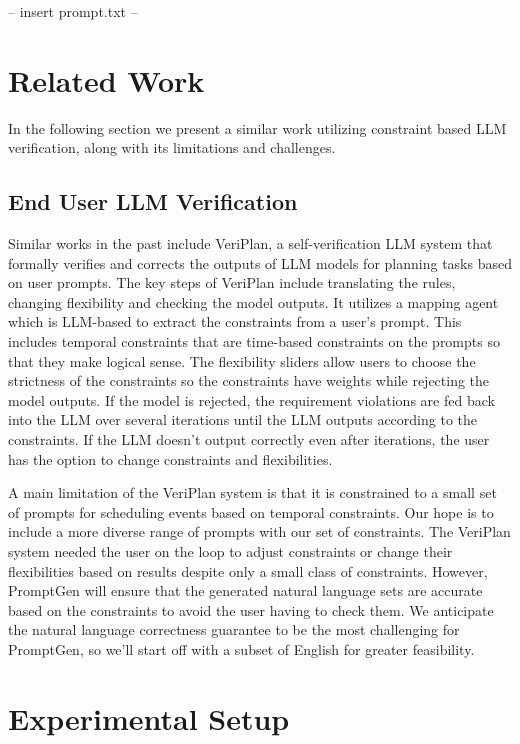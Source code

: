 \documentclass{article}
\begin{document}
-- insert prompt.txt -- 

\section{Related Work}
\label{gen_inst}

In the following section we present a similar work utilizing constraint based LLM verification, along with its limitations and challenges.

\subsection{End User LLM Verification}


Similar works in the past include VeriPlan, a self-verification LLM system that formally verifies and corrects the outputs of LLM models for planning tasks based on user prompts.  The key steps of VeriPlan include translating the rules, changing flexibility and checking the model outputs.  It utilizes a mapping agent which is LLM-based to extract the constraints from a user’s prompt.  This includes temporal constraints that are time-based constraints on the prompts so that they make logical sense.  The flexibility sliders allow users to choose the strictness of the constraints so the constraints have weights while rejecting the model outputs.  If the model is rejected, the requirement violations are fed back into the LLM over several iterations until the LLM outputs according to the constraints.  If the LLM doesn’t output correctly even after iterations, the user has the option to change constraints and flexibilities.

A main limitation of the VeriPlan system is that it is constrained to a small set of prompts for scheduling events based on temporal constraints.  Our hope is to include a more diverse range of prompts with our set of constraints.  The VeriPlan system needed the user on the loop to adjust constraints or change their flexibilities based on results despite only a small class of constraints.   However, PromptGen will ensure that the generated natural language sets are accurate based on the constraints to avoid the user having to check them.  We anticipate the natural language correctness guarantee to be the most challenging for PromptGen, so we’ll start off with a subset of English for greater feasibility.


\section{Experimental Setup}
\end{document}
